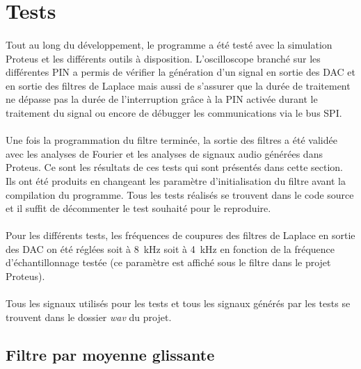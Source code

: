 \documentclass{article}
\begin{document}
    \section{Tests}
    \paragraph{}
    Tout au long du développement, le programme a été testé avec la simulation Proteus et les différents outils à disposition. L'oscilloscope branché sur les différentes PIN a permis de vérifier la génération d'un signal en sortie des DAC et en sortie des filtres de Laplace mais aussi de s'assurer que la durée de traitement ne dépasse pas la durée de l'interruption grâce à la PIN activée durant le traitement du signal ou encore de débugger les communications via le bus SPI.

    \paragraph{}
    Une fois la programmation du filtre terminée, la sortie des filtres a été validée avec les analyses de Fourier et les analyses de signaux audio générées dans Proteus. Ce sont les résultats de ces tests qui sont présentés dans cette section. Ils ont été produits en changeant les paramètre d'initialisation du filtre avant la compilation du programme. Tous les tests réalisés se trouvent dans le code source et il suffit de décommenter le test souhaité pour le reproduire.

    \paragraph{}
    Pour les différents tests, les fréquences de coupures des filtres de Laplace en sortie des DAC on été réglées soit à \SI{8}{\kilo\hertz} soit à \SI{4}{\kilo\hertz} en fonction de la fréquence d'échantillonnage testée (ce paramètre est affiché sous le filtre dans le projet Proteus).

    \paragraph{}
    Tous les signaux utilisés pour les tests et tous les signaux générés par les tests se trouvent dans le dossier \emph{wav} du projet.


    \subsection{Filtre par moyenne glissante}
\end{document}
